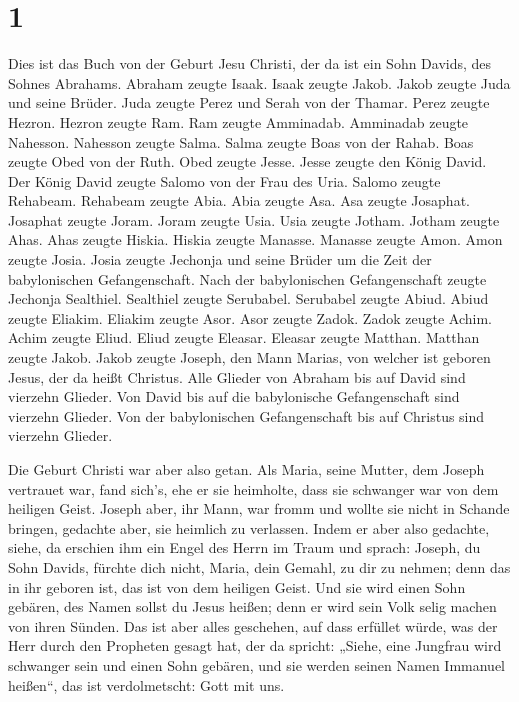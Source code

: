 \hypertarget{section}{%
\section{1}\label{section}}

 Dies ist das Buch von der Geburt Jesu Christi, der da ist
ein Sohn Davids, des Sohnes Abrahams.  Abraham zeugte
Isaak. Isaak zeugte Jakob. Jakob zeugte Juda und seine Brüder.
 Juda zeugte Perez und Serah von der Thamar. Perez zeugte
Hezron. Hezron zeugte Ram.  Ram zeugte Amminadab.
Amminadab zeugte Nahesson. Nahesson zeugte Salma.  Salma
zeugte Boas von der Rahab. Boas zeugte Obed von der Ruth. Obed zeugte
Jesse.  Jesse zeugte den König David. Der König David
zeugte Salomo von der Frau des Uria.  Salomo zeugte
Rehabeam. Rehabeam zeugte Abia. Abia zeugte Asa.  Asa
zeugte Josaphat. Josaphat zeugte Joram. Joram zeugte Usia.
 Usia zeugte Jotham. Jotham zeugte Ahas. Ahas zeugte
Hiskia.  Hiskia zeugte Manasse. Manasse zeugte Amon. Amon
zeugte Josia.  Josia zeugte Jechonja und seine Brüder um
die Zeit der babylonischen Gefangenschaft.  Nach der
babylonischen Gefangenschaft zeugte Jechonja Sealthiel. Sealthiel zeugte
Serubabel.  Serubabel zeugte Abiud. Abiud zeugte Eliakim.
Eliakim zeugte Asor.  Asor zeugte Zadok. Zadok zeugte
Achim. Achim zeugte Eliud.  Eliud zeugte Eleasar. Eleasar
zeugte Matthan. Matthan zeugte Jakob.  Jakob zeugte
Joseph, den Mann Marias, von welcher ist geboren Jesus, der da heißt
Christus.  Alle Glieder von Abraham bis auf David sind
vierzehn Glieder. Von David bis auf die babylonische Gefangenschaft sind
vierzehn Glieder. Von der babylonischen Gefangenschaft bis auf Christus
sind vierzehn Glieder.

 Die Geburt Christi war aber also getan. Als Maria, seine
Mutter, dem Joseph vertrauet war, fand sich's, ehe er sie heimholte,
dass sie schwanger war von dem heiligen Geist.  Joseph
aber, ihr Mann, war fromm und wollte sie nicht in Schande bringen,
gedachte aber, sie heimlich zu verlassen.  Indem er aber
also gedachte, siehe, da erschien ihm ein Engel des Herrn im Traum und
sprach: Joseph, du Sohn Davids, fürchte dich nicht, Maria, dein Gemahl,
zu dir zu nehmen; denn das in ihr geboren ist, das ist von dem heiligen
Geist.  Und sie wird einen Sohn gebären, des Namen sollst
du Jesus heißen; denn er wird sein Volk selig machen von ihren Sünden.
 Das ist aber alles geschehen, auf dass erfüllet würde,
was der Herr durch den Propheten gesagt hat, der da spricht:
 „Siehe, eine Jungfrau wird schwanger sein und einen Sohn
gebären, und sie werden seinen Namen Immanuel heißen``, das ist
verdolmetscht: Gott mit uns.


